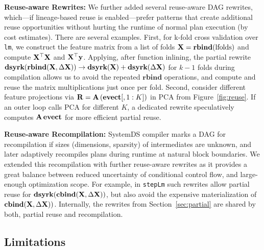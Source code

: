 \textbf{Reuse-aware Rewrites:} We further added several reuse-aware DAG rewrites, which---if lineage-based reuse is enabled---prefer patterns that create additional reuse opportunities without hurting the runtime of normal plan execution (by cost estimates). There are several examples. First, for k-fold cross validation over \texttt{lm}, we construct the feature matrix from a list of folds $\mathbf{X} = \textbf{rbind}(\text{lfolds})$ and compute $\mathbf{X}^{\top}\mathbf{X}$ and $\mathbf{X}^{\top}\mathbf{y}$. Applying, after function inlining, the partial rewrite $\textbf{dsyrk}(\textbf{rbind}(\mathbf{X},\Delta\mathbf{X})) \rightarrow \textbf{dsyrk}(\mathbf{X}) + \textbf{dsyrk}(\Delta\mathbf{X})$ for $k-1$ folds during compilation allows us to avoid the repeated $\textbf{rbind}$ operations, and compute and reuse the matrix multiplications just once per fold. Second, consider different feature projections via $\mathbf{R} = \mathbf{A}\,(\mathbf{evect}[,1:K])$ in PCA from Figure~\ref{fig:reuse}. If an outer loop calls PCA for different $K$, a dedicated rewrite speculatively computes $\mathbf{A}\,\mathbf{evect}$ for more efficient partial reuse.

\textbf{Reuse-aware Recompilation:} SystemDS compiler marks a DAG for recompilation if sizes (dimensions, sparsity) of intermediates are unknown, and later adaptively recompiles plans during runtime at natural block boundaries. We extended this recompilation with further reuse-aware rewrites as it provides a great balance between reduced uncertainty of conditional control flow, and large-enough optimization scope. For example, in \texttt{stepLm} such rewrites allow partial reuse for $\textbf{dsyrk}(\textbf{cbind}(\mathbf{X},\Delta\mathbf{X}))$, but also avoid the expensive materialization of $\textbf{cbind}(\mathbf{X},\Delta\mathbf{X}))$. Internally, the rewrites from Section~\ref{sec:partial} are shared by both, partial reuse and recompilation.

\subsection{Limitations}
\label{sec:limitations}

